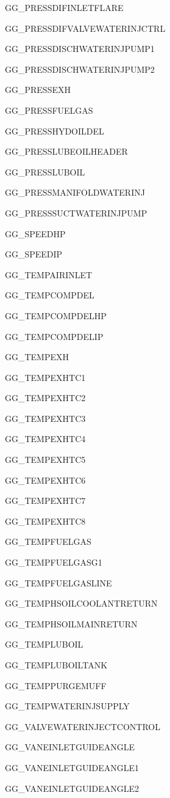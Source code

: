 \documentclass[runningheads]{llncs}
\begin{document}
\begin{multicols}{3}
\begin{enumerate}
{			\item GG\_PRESSDIFINLETFLARE
			\item GG\_PRESSDIFVALVEWATERINJCTRL
			\item GG\_PRESSDISCHWATERINJPUMP1
			\item GG\_PRESSDISCHWATERINJPUMP2
			\item GG\_PRESSEXH
			\item GG\_PRESSFUELGAS
			\item GG\_PRESSHYDOILDEL
			\item GG\_PRESSLUBEOILHEADER
			\item GG\_PRESSLUBOIL
			\item GG\_PRESSMANIFOLDWATERINJ
			\item GG\_PRESSSUCTWATERINJPUMP
			\item GG\_SPEEDHP
			\item GG\_SPEEDIP
			\item GG\_TEMPAIRINLET
			\item GG\_TEMPCOMPDEL
			\item GG\_TEMPCOMPDELHP
			\item GG\_TEMPCOMPDELIP
			\item GG\_TEMPEXH
			\item GG\_TEMPEXHTC1
			\item GG\_TEMPEXHTC2
			\item GG\_TEMPEXHTC3
			\item GG\_TEMPEXHTC4
			\item GG\_TEMPEXHTC5
			\item GG\_TEMPEXHTC6
			\item GG\_TEMPEXHTC7
			\item GG\_TEMPEXHTC8
			\item GG\_TEMPFUELGAS
			\item GG\_TEMPFUELGASG1
			\item GG\_TEMPFUELGASLINE
			\item GG\_TEMPHSOILCOOLANTRETURN
			\item GG\_TEMPHSOILMAINRETURN
			\item GG\_TEMPLUBOIL
			\item GG\_TEMPLUBOILTANK
			\item GG\_TEMPPURGEMUFF
			\item GG\_TEMPWATERINJSUPPLY
			\item GG\_VALVEWATERINJECTCONTROL
			\item GG\_VANEINLETGUIDEANGLE
			\item GG\_VANEINLETGUIDEANGLE1
			\item GG\_VANEINLETGUIDEANGLE2
}
\end{enumerate}
\end{multicols}
\end{document}
